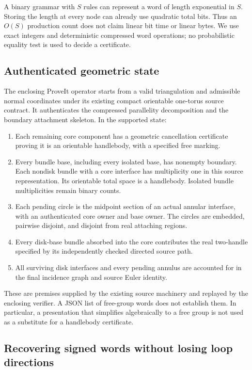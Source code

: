 \documentclass[11pt,a4paper]{article}
\theoremstyle{definition}
\theoremstyle{remark}
\begin{document}
A binary grammar with $S$ rules can represent a word of length exponential
in $S$. Storing the length at every node can already use quadratic total
bits. Thus an $O(S)$ production count does not claim linear bit time or
linear bytes. We use exact integers and deterministic compressed word
operations; no probabilistic equality test is used to decide a certificate.

\subsection{Authenticated geometric state}

The enclosing ProveIt operator starts from a valid triangulation and
admissible normal coordinates under its existing compact orientable
one-torus source contract. It authenticates the compressed parallelity
decomposition and the boundary attachment skeleton. In the supported state:

\begin{enumerate}
\item Each remaining core component has a geometric cancellation certificate
proving it is an orientable handlebody, with a specified free marking.
\item Every bundle base, including every isolated base, has nonempty
boundary. Each nondisk bundle with a core interface has multiplicity one
in this source representation. Its orientable total space is a handlebody.
Isolated bundle multiplicities remain binary counts.
\item Each pending circle is the midpoint section of an actual annular
interface, with an authenticated core owner and base owner. The circles are
embedded, pairwise disjoint, and disjoint from real attaching regions.
\item Every disk-base bundle absorbed into the core contributes the real
two-handle specified by its independently checked directed source path.
\item All surviving disk interfaces and every pending annulus are accounted
for in the final incidence graph and source Euler identity.
\end{enumerate}

These are premises supplied by the existing source machinery and replayed
by the enclosing verifier. A JSON list of free-group words does not establish
them. In particular, a presentation that simplifies algebraically to a free
group is not used as a substitute for a handlebody certificate.

\subsection{Recovering signed words without losing loop directions}
\end{document}
